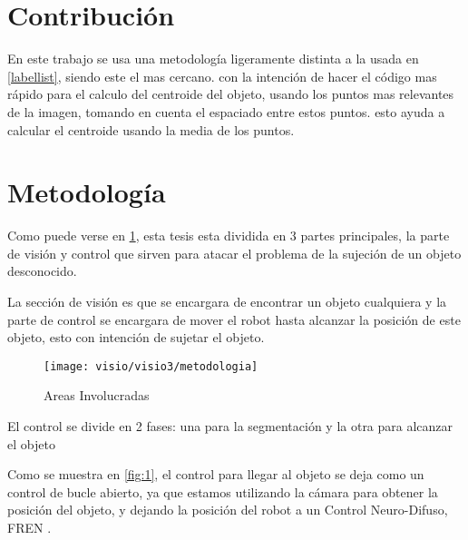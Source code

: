\section{Contribución}
En este trabajo se usa una metodología ligeramente distinta a la usada en \cref{labellist},  siendo este el mas cercano.
con la intención de hacer el código mas rápido para el calculo del centroide del objeto, usando los puntos mas relevantes de la imagen, tomando en cuenta el espaciado entre estos puntos.
esto ayuda a calcular el centroide usando la media de los puntos.

\section{Metodología}

Como puede verse en \cref{fig:metodologia}, esta tesis esta dividida en 3 partes principales, la parte de visión y control que sirven para atacar el problema de la sujeción de un objeto desconocido.

La sección de visión es que se encargara de encontrar un objeto cualquiera y la parte de control se encargara de mover el robot hasta alcanzar la posición de este objeto, esto con intención de sujetar el objeto.

\begin{figure}[h]
	\centering
	\texttt{[image: visio/visio3/metodologia]}
	\caption{Areas Involucradas}
	\label{fig:metodologia}
\end{figure}

El control se divide en 2 fases: una para la segmentación y la otra para alcanzar el objeto

Como se muestra en \cref{fig:1}, el control para llegar al objeto se deja como un control de bucle abierto, ya que estamos utilizando la cámara para obtener la posición del objeto, y dejando la posición del robot a un Control Neuro-Difuso, FREN \cite{fren}.


